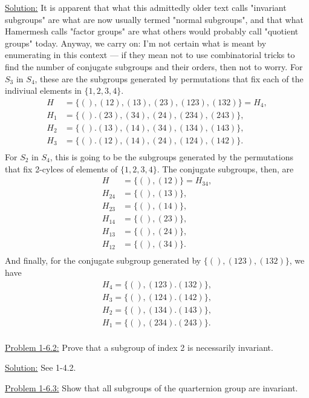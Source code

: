\documentclass[12pt]{article}
\begin{document}
\underline{Solution:} It is apparent that what this admittedly older text calls
"invariant subgroups" are what are now usually termed "normal subgroups", and
that what Hamermesh calls "factor groups" are what others would probably call
"quotient groups" today. Anyway, we carry on: I'm not certain what is meant
by enumerating in this context --- if they mean not to use combinatorial
tricks to find the number of conjugate subgroups and their orders, then not to
worry. For $S_3$ in $S_4$, these are the subgroups generated by permutations
that fix each of the indiviual elements in $\{1,2,3,4\}$.
\begin{align*}
    H   &= \{(), (12),(13),(23),(123), (132)\} = H_4,\\
    H_1 &= \{(). (23),(34),(24),(234),(243) \},\\
    H_2 &= \{(). (13),(14),(34),(134),(143) \},\\
    H_3 &= \{(). (12),(14),(24),(124),(142) \}.\\
\end{align*}
For $S_2$ in $S_4$, this is going to be the subgroups generated by the
permutations that fix 2-cylces of elements of $\{1,2,3,4\}$. The conjugate
subgroups, then, are
\begin{align*}
    H &= \{(),(12)\} = H_{34},\\
    H_{24} &= \{(),(13)\},\\
    H_{23} &= \{(),(14)\},\\
    H_{14} &= \{(),(23)\},\\
    H_{13} &= \{(),(24)\},\\
    H_{12} &= \{(),(34)\}.\\
\end{align*}
And finally,  for the conjugate subgroup generated by $\{(), (123), (132) \}$,
we have
\begin{align*}
    H_4 = \{(), (123). (132) \},\\
    H_3 = \{(), (124). (142) \},\\
    H_2 = \{(), (134). (143) \},\\
    H_1 = \{(), (234). (243) \}.\\
\end{align*}

\underline{Problem 1-6.2:} Prove that a subgroup of index 2 is necessarily
invariant. 

\underline{Solution:} See 1-4.2.

\underline{Problem 1-6.3:} Show that all subgroups of the quarternion group are
invariant.
\end{document}
